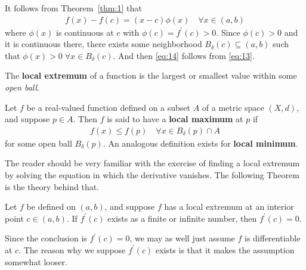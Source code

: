 \documentclass[thmcnt=section, 12pt]{my-elegantbook}
\begin{document}
\begin{solution}
    It follows from Theorem~\ref{thm:1} that 
    \begin{align}
        f(x) - f(c) = (x - c) \phi(x)
        \quad \forall x \in (a, b)
        \label{eq:13}
    \end{align}
    where $\phi(x)$ is continuous at $c$ with $\phi(c) = f^\prime(c) > 0$. Since $\phi(c) > 0$ and it is continuous there, there exists some neighborhood $B_\delta(c) \subseteq (a, b)$ such that $\phi(x) > 0 \; \forall x \in B_\delta(c)$. And then \eqref{eq:14} follows from \eqref{eq:13}.
\end{solution}


\par The \textbf{local extremum} of a function is the largest or smallest value within some \textit{open ball}.

\begin{definition}
    Let $f$ be a real-valued function defined on a subset $A$ of a metric space $(X, d)$, and suppose $p \in A$. Then $f$ is said to have a \textbf{local maximum} at $p$ if 
    \begin{align*}
        f(x) \leq f(p)
        \quad \forall x \in B_\delta(p) \cap A
    \end{align*} 
    for some open ball $B_\delta(p)$. An analogous definition exists for \textbf{local minimum}.
\end{definition}


\par The reader should be very familiar with the exercise of finding a local extremum by solving the equation in which the derivative vanishes. The following Theorem is the theory behind that.

\begin{theorem} \label{thm:5}
    Let $f$ be defined on $(a, b)$, and suppose $f$ has a local extremum at an interior point $c \in (a, b)$. If $f^\prime(c)$ exists as a finite or infinite number, then $f^\prime(c) = 0$.
\end{theorem}

\begin{remark}
    Since the conclusion is $f^\prime(c) = 0$, we may as well just assume $f$ is differentiable at $c$. The reason why we suppose $f^\prime(c)$ exists is that it makes the assumption somewhat looser.
\end{remark}
\end{document}
